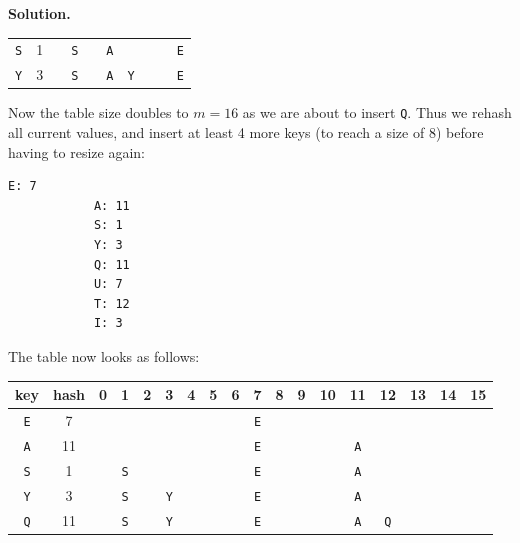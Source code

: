 \documentclass[12pt, a4paper]{article}
\newenvironment{sol}[1][Solution]
{\par\medskip\noindent \textbf{#1.} }
{\medskip}
\begin{document}
\begin{sol}
\begin{center}
\begin{tabular}{cc|cccccccc}
				\texttt{S} & 1 &
				{} & {\color{red}\texttt{S}} & {} & {\color{gray}\texttt{A}} & {} & {} & {} & {\color{gray} \texttt{E}} \\
				
				\texttt{Y} & 3 &
				{} & {\color{gray}\texttt{S}} & {} & {\color{black}\texttt{A}} & {\color{red}\texttt{Y}} & {} & {} & {\color{gray} \texttt{E}} \\
			\end{tabular}
		\end{center}
		Now the table size doubles to $m=16$ as we are about to insert \texttt{Q}. Thus we rehash
		all current values, and insert at least 4 more keys (to reach a size of 8) before having
		to resize again:
		\begin{lstlisting}[language={}]
			E: 7
			A: 11
			S: 1
			Y: 3
			Q: 11
			U: 7
			T: 12
			I: 3
		\end{lstlisting}
		The table now looks as follows:
		\begin{center}
			\begin{tabular}{cc|cccccccccccccccc}
				{\color{red} key} & {\color{red} hash} &
				0 & 1 & 2 & 3 & 4 & 5 & 6 & 7 & 8 & 9 & 10 & 11 & 12 & 13 & 14 & 15\\
				\hline
				
				\texttt{E} & 7 &
				{} & {} & {} & {} & {} & {} & {} & {\color{red} \texttt{E}} & {} & {} & {} & {} & {} & {} & {} & {} \\
				
				\texttt{A} & 11 &
				{} & {} & {} & {} & {} & {} & {} & {\color{gray} \texttt{E}} & {} & {} & {} & {\color{red}\texttt{A}} & {} & {} & {} & {} \\
				
				\texttt{S} & 1 &
				{} & {\color{red}\texttt{S}} & {} & {} & {} & {} & {} & {\color{gray} \texttt{E}} & {} & {} & {} & {\color{gray}\texttt{A}} & {} & {} & {} & {} \\
				
				\texttt{Y} & 3 &
				{} & {\color{gray}\texttt{S}} & {} & {\color{red}\texttt{Y}} & {} & {} & {} & {\color{gray} \texttt{E}} & {} & {} & {} & {\color{gray}\texttt{A}} & {} & {} & {} & {} \\
				
				\texttt{Q} & 11 &
				{} & {\color{gray}\texttt{S}} & {} & {\color{gray}\texttt{Y}} & {} & {} & {} & {\color{gray} \texttt{E}} & {} & {} & {} & {\color{black}\texttt{A}} & {\color{red}\texttt{Q}} & {} & {} & {} \\
				

\end{tabular}
\end{center}
\end{sol}
\end{document}
